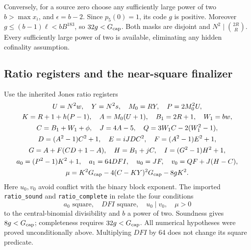 Conversely, for a source zero choose any sufficiently large power of two
\(b>\max x_i\), and \(\epsilon=b-2\). Since \(p_5(0)=1\), its code
\(g\) is positive. Moreover
\(g\leq(b-1)\ell<bB^{183}\), so \(32g<G_{\rm cap}\).
Both masks are disjoint and \(N^2\mid\binom{2R}{R}\).
Every sufficiently large power of two is available, eliminating any hidden
cofinality assumption.

\subsection{Ratio registers and the near-square finalizer}
Use the inherited Jones ratio registers
\begin{gather*}
 U=N^2w,\quad Y=N^2s,\quad M_0=RY,\quad P=2M_0^2U,\\
 K=R+1+h(P-1),\quad A=M_0(U+1),\quad B_1=2R+1,\quad W_1=bw,\\
 C=B_1+W_1+\phi,\quad J=4A-5,\quad Q=3W_1C-2(W_1^2-1),\\
 D=(A^2-1)C^2+1,\quad E=iJDC^2,\quad F=(A^2-1)E^2+1,\\
 G=A+F(CD+1-A),\quad H=B_1+jC,\quad I=(G^2-1)H^2+1,\\
 a_0=(P^2-1)K^2+1,\quad a_1=64DFI,\quad u_0=JF,\quad v_0=QF+J(H-C),\\
 \mu=K^2G_{\rm cap}-4(C-KY)^2G_{\rm cap}-8gK^2.
\end{gather*}
Here \(u_0,v_0\) avoid conflict with the binary block exponent.
The imported \texttt{ratio\_sound} and \texttt{ratio\_complete} in
 relate the four conditions
\[
 a_0\text{ square},\quad DFI\text{ square},\quad u_0\mid v_0,\quad\mu>0
\]
to the central-binomial divisibility and \(b\) a power of two. Soundness
gives \(8g<G_{\rm cap}\); completeness requires \(32g<G_{\rm cap}\).
All numerical hypotheses were proved unconditionally above. Multiplying
\(DFI\) by 64 does not change its square predicate.

